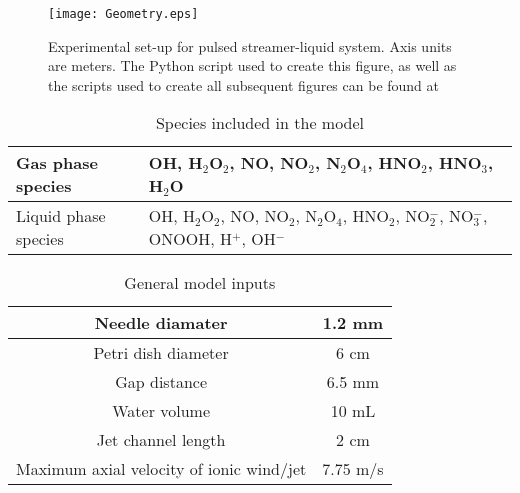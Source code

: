 \begin{figure}[htb]
    \centering
        \texttt{[image: Geometry.eps]}
    \caption{Experimental set-up for pulsed streamer-liquid system. Axis units are meters. The Python script used to create this figure, as well as the scripts used to create all subsequent figures can be found at \cite{scriptsLocation}}
    \label{fig:model_geom}
\end{figure}

\begin{table}[htpb]
    \begin{center}
        \begin{tabular}{|l| p{10cm}|}
            \hline
            Gas phase species & OH, H$_2$O$_2$, NO, NO$_2$, N$_2$O$_4$, HNO$_2$, HNO$_3$, H$_2$O \\
            \hline
            Liquid phase species & OH, H$_2$O$_2$, NO, NO$_2$, N$_2$O$_4$, HNO$_2$, NO$_2^-$, NO$_3^-$, ONOOH, H$^+$, OH$^-$ \\
            \hline
        \end{tabular}
    \end{center}
    \caption{Species included in the model}
    \label{tab:species_list}
\end{table}


\begin{table}[htpb]
    \begin{center}
        \begin{tabular}{|c |c |}
        \hline
        Needle diamater & 1.2 mm \\
        \hline
        Petri dish diameter & 6 cm \\
        \hline
        Gap distance & 6.5 mm \\
        \hline
        Water volume & 10 mL \\
        \hline
        Jet channel length & 2 cm \\
        \hline
        Maximum axial velocity of ionic wind/jet & 7.75 m/s \\
        \hline
        \end{tabular}
    \end{center}
    \caption{General model inputs}
    \label{tab:gen_inputs}
\end{table}

